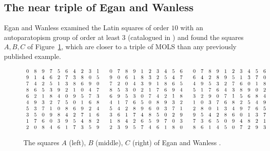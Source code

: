 \documentclass[11pt]{article}
\theoremstyle{remark}
\begin{document}
\subsection{The near triple of Egan and Wanless}\label{sec:ew}

Egan and Wanless \cite[Section~8]{EW16} examined the Latin squares of order $10$ with an
autoparatopism group of order at least $3$ (catalogued in \cite{MMM07}) and found the
squares $A,B,C$ of Figure~\ref{fig:ew}, which are closer to a triple of MOLS than any
previously published example.

\begin{figure}[ht]
\centering
\setlength{\arraycolsep}{2.6pt}
$\begin{array}{*{10}{c}@{\hspace{2em}}*{10}{c}@{\hspace{2em}}*{10}{c}}
0 & 8 & 9 & 7 & 5 & 6 & 4 & 2 & 3 & 1 & 0 & 7 & 8 & 9 & 1 & 2 & 3 & 4 & 5 & 6 & 0 & 7 & 8 & 9 & 1 & 2 & 3 & 4 & 5 & 6\\
9 & 1 & 4 & 6 & 2 & 7 & 3 & 8 & 0 & 5 & 9 & 0 & 6 & 1 & 8 & 3 & 2 & 5 & 4 & 7 & 6 & 4 & 2 & 8 & 9 & 5 & 1 & 3 & 7 & 0\\
7 & 4 & 2 & 5 & 1 & 3 & 8 & 6 & 9 & 0 & 7 & 2 & 0 & 4 & 3 & 9 & 1 & 8 & 6 & 5 & 4 & 9 & 5 & 3 & 2 & 7 & 6 & 0 & 1 & 8\\
8 & 6 & 5 & 3 & 9 & 2 & 1 & 0 & 4 & 7 & 8 & 5 & 3 & 0 & 2 & 1 & 7 & 6 & 9 & 4 & 5 & 1 & 7 & 6 & 4 & 3 & 8 & 9 & 0 & 2\\
6 & 2 & 1 & 8 & 4 & 0 & 9 & 5 & 7 & 3 & 6 & 9 & 5 & 3 & 0 & 7 & 4 & 2 & 1 & 8 & 3 & 2 & 9 & 0 & 7 & 1 & 5 & 6 & 8 & 4\\
4 & 9 & 3 & 2 & 7 & 5 & 0 & 1 & 6 & 8 & 4 & 1 & 7 & 6 & 5 & 0 & 8 & 9 & 3 & 2 & 1 & 0 & 3 & 7 & 6 & 8 & 2 & 5 & 4 & 9\\
5 & 3 & 7 & 1 & 0 & 8 & 6 & 9 & 2 & 4 & 5 & 4 & 2 & 8 & 9 & 6 & 0 & 3 & 7 & 1 & 2 & 8 & 0 & 1 & 3 & 4 & 9 & 7 & 6 & 5\\
3 & 5 & 0 & 9 & 8 & 4 & 2 & 7 & 1 & 6 & 3 & 6 & 1 & 7 & 4 & 8 & 5 & 0 & 2 & 9 & 9 & 5 & 4 & 2 & 8 & 6 & 0 & 1 & 3 & 7\\
1 & 7 & 6 & 0 & 3 & 9 & 5 & 4 & 8 & 2 & 1 & 8 & 4 & 2 & 6 & 5 & 9 & 7 & 0 & 3 & 7 & 3 & 6 & 5 & 0 & 9 & 4 & 8 & 2 & 1\\
2 & 0 & 8 & 4 & 6 & 1 & 7 & 3 & 5 & 9 & 2 & 3 & 9 & 5 & 7 & 4 & 6 & 1 & 8 & 0 & 8 & 6 & 1 & 4 & 5 & 0 & 7 & 2 & 9 & 3\\
\end{array}$
\caption{The squares $A$ (left), $B$ (middle), $C$ (right) of Egan and Wanless
\cite[Section~8]{EW16}.}
\label{fig:ew}
\end{figure}
\end{document}
